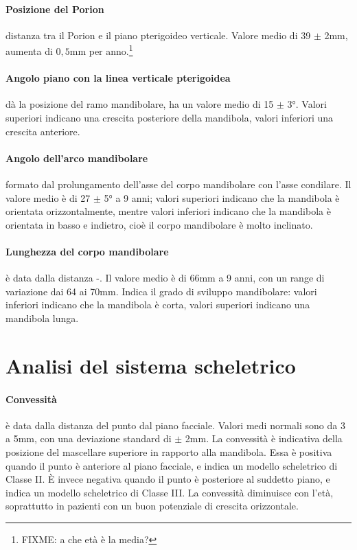 \paragraph{Posizione del Porion} distanza tra il Porion e il piano pterigoideo verticale. Valore medio di 39 $\pm$ 2mm, aumenta di $0,5$mm per anno.\footnote{FIXME: a che età è la media?}

\paragraph{Angolo piano  con la linea verticale pterigoidea} dà la posizione del ramo mandibolare, ha un valore medio di 15 $\pm$ 3°. Valori superiori indicano una crescita posteriore della mandibola, valori inferiori una crescita anteriore.

\paragraph{Angolo dell'arco mandibolare} formato dal prolungamento dell'asse del corpo mandibolare con l'asse condilare. Il valore medio è di 27 $\pm$ 5° a 9 anni; valori superiori indicano che la mandibola è orientata orizzontalmente, mentre valori inferiori indicano che la mandibola è orientata in basso e indietro, cioè il corpo mandibolare è molto inclinato.

\paragraph{Lunghezza del corpo mandibolare} è data dalla distanza -. Il valore medio è di 66mm a 9 anni, con un range di variazione dai 64 ai 70mm. Indica il grado di sviluppo mandibolare: valori inferiori indicano che la mandibola è corta, valori superiori indicano una mandibola lunga.

\section{Analisi del sistema scheletrico}
\paragraph{Convessità} è data dalla distanza del punto  dal piano facciale. Valori medi normali sono da 3 a 5mm, con una deviazione standard di $\pm$ 2mm. La convessità è indicativa della posizione del mascellare superiore in rapporto alla mandibola. Essa è positiva quando il punto  è anteriore al piano facciale, e indica un modello scheletrico di Classe II. È invece negativa quando il punto  è posteriore al suddetto piano, e indica un modello scheletrico di Classe III. La convessità diminuisce con l'età, soprattutto in pazienti con un buon potenziale di crescita orizzontale.

